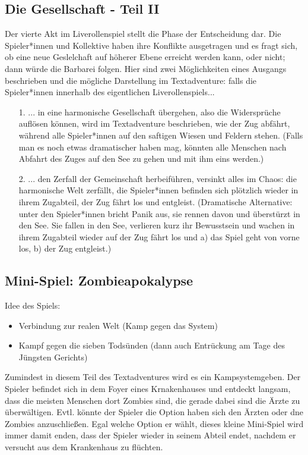 \documentclass[a4paper, 12pt]{scrartcl}
\begin{document}
    \subsection{Die Gesellschaft - Teil II} \label{die-gesellschaft2}
    Der vierte Akt im Liverollenspiel stellt die Phase der Entscheidung dar. 
    Die Spieler*innen und Kollektive haben ihre Konflikte ausgetragen und es fragt sich, ob eine neue Geslelchaft auf höherer Ebene erreicht werden kann, oder nicht; dann würde die Barbarei folgen.
    Hier sind zwei Möglichkeiten eines Ausgangs beschrieben und die mögliche Darstellung im Textadventure: falls die Spieler*innen innerhalb des eigentlichen Liverollenspiels...
    \begin{itemize}
    \item[1.] ... in eine harmonische Gesellschaft übergehen, also die Widersprüche auflösen können, wird im Textadventure beschrieben, wie der Zug abfährt, während alle Spieler*innen auf den saftigen Wiesen und Feldern stehen. 
    (Falls man es noch etwas dramatischer haben mag, könnten alle Menschen nach Abfahrt des Zuges auf den See zu gehen und mit ihm eins werden.)
    \item[2.] ... den Zerfall der Gemeinschaft herbeiführen, versinkt alles im Chaos: die harmonische Welt zerfällt, die Spieler*innen befinden sich plötzlich wieder in ihrem Zugabteil, der Zug fährt los und entgleist. 
    (Dramatische Alternative: unter den Spieler*innen bricht Panik aus, sie rennen davon und überstürzt in den See.
    Sie fallen in den See, verlieren kurz ihr Bewusstsein und wachen in ihrem Zugabteil wieder auf der Zug fährt los und a) das Spiel geht von vorne los, b) der Zug entgleist.)
    \end{itemize}

    \subsection{Mini-Spiel: Zombieapokalypse} \label{zombieapokalypse}
    Idee des Spiels:
    \begin{itemize}
    \item Verbindung zur realen Welt (Kamp gegen das System)
    \item Kampf gegen die sieben Todsünden (dann auch Entrückung am Tage des Jüngsten Gerichts)
    \end{itemize}
    Zumindest in diesem Teil des Textadventures wird es ein Kampsystemgeben. 
    Der Spieler befindet sich in dem Foyer eines Krnakenhauses und entdeckt langsam, dass die meisten Menschen dort Zombies sind, die gerade dabei sind die Ärzte zu überwältigen. 
    Evtl. könnte der Spieler die Option haben sich den Ärzten oder dne Zombies anzuschließen.
    Egal welche Option er wählt, dieses kleine Mini-Spiel wird immer damit enden, dass der Spieler wieder in seinem Abteil endet, nachdem er versucht aus dem Krankenhaus zu flüchten.
\end{document}
